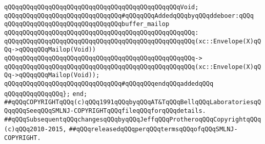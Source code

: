 \verb|qQQqqQQqqQQqqQQqqQQqqQQqqQQqqQQqqQQqqQQqqQQqqQQqVoid;|\newline
\newline
\verb|qQQqqQQqqQQqqQQqqQQqqQQqqQQqqQQq#qQQqqQQqAddedqQQqbyqQQqddeboer:qQQq|\newline
\newline
\verb|qQQqqQQqqQQqqQQqqQQqqQQqqQQqqQQqbuffer_mailop|\newline
\verb|qQQqqQQqqQQqqQQqqQQqqQQqqQQqqQQqqQQqqQQqqQQqqQQqqQQq:|\newline
\verb|qQQqqQQqqQQqqQQqqQQqqQQqqQQqqQQqqQQqqQQqqQQqqQQqqQQq(xc::Envelope(X)qQQq->qQQqqQQqMailop(Void))|\newline
\verb|qQQqqQQqqQQqqQQqqQQqqQQqqQQqqQQqqQQqqQQqqQQqqQQqqQQq->|\newline
\verb|qQQqqQQqqQQqqQQqqQQqqQQqqQQqqQQqqQQqqQQqqQQqqQQqqQQq(xc::Envelope(X)qQQq->qQQqqQQqMailop(Void));|\newline
\newline
\verb|qQQqqQQqqQQqqQQqqQQqqQQqqQQqqQQq#qQQqqQQqendqQQqaddedqQQq|\newline
\verb|qQQqqQQqqQQqqQQq};|\newline
\newline
\verb|end;|\newline
\newline
\verb|##qQQqCOPYRIGHTqQQq(c)qQQq1991qQQqbyqQQqAT&TqQQqBellqQQqLaboratoriesqQQqqQQqSeeqQQqSMLNJ-COPYRIGHTqQQqfileqQQqforqQQqdetails.|\newline
\verb|##qQQqSubsequentqQQqchangesqQQqbyqQQqJeffqQQqProtheroqQQqCopyrightqQQq(c)qQQq2010-2015,|\newline
\verb|##qQQqreleasedqQQqperqQQqtermsqQQqofqQQqSMLNJ-COPYRIGHT.|\newline

